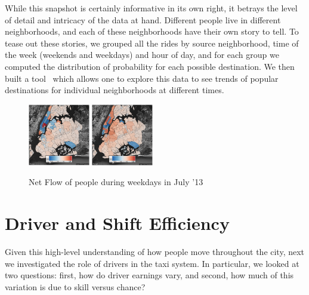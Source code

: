 \documentclass[twocolumn]{article}
\begin{document}
While this snapshot is certainly informative in its own right, it betrays the level of detail and intricacy of the data at hand. Different people live in different neighborhoods, and each of these neighborhoods have their own story to tell. To tease out these stories, we grouped all the rides by source neighborhood, time of the week (weekends and weekdays) and hour of day, and for each group we computed the distribution of probability for each possible destination. We then built a tool~\cite{DS3:2016} which allows one to explore this data to see trends of popular destinations for individual neighborhoods at different times. 


\begin{figure}[t]
 \centering
 \includegraphics[width=0.24\textwidth]{7am} 
 \includegraphics[width=0.24\textwidth]{7pm}
 
 
\caption{Net Flow of people during weekdays in July '13}
\label{fig:flow}
\end{figure}

\section{Driver and Shift Efficiency}
Given this high-level understanding of how people move throughout the city, next we investigated the role of drivers in the taxi system. In particular, we looked at two questions: first, how do driver earnings vary, and second, how much of this variation is due to skill versus chance?
\end{document}
